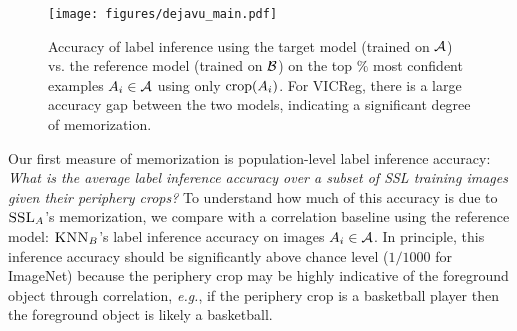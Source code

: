 \begin{wrapfigure}{r}{0.4\textwidth} 
    \centering
    \texttt{[image: figures/dejavu\_main.pdf]}
    \caption[Accuracy of label inference using the target model (trained on $\calA$) vs. the reference model (trained on $\calB$) on the top $\%$ most confident examples $A_i \in \calA$ using only $\crop{A_i}$.]{Accuracy of label inference using the target model (trained on $\calA$) vs. the reference model (trained on $\calB$) on the top $\%$ most confident examples $A_i \in \calA$ using only $\crop{A_i}$. For VICReg, there is a large accuracy gap between the two models, indicating a significant degree of \dejavu memorization.}
    \label{fig:dejavu main}
    \vspace{-2ex}
\end{wrapfigure}

Our first measure of \dejavu memorization is population-level label inference accuracy: \emph{What is the average label inference accuracy over a subset of SSL training images given their periphery crops?} 
To understand how much of this accuracy is due to $\textsc{SSL}_A$'s \dejavu memorization, we compare with a correlation baseline using the reference model: $\textsc{KNN}_B$'s label inference accuracy on images $A_i \in \calA$. 
In principle, this inference accuracy should be significantly above chance level ($1/1000$ for ImageNet) because the periphery crop may be highly indicative of the foreground object through correlation, \emph{e.g.}, if the periphery crop is a basketball player then the foreground object is likely a basketball.

